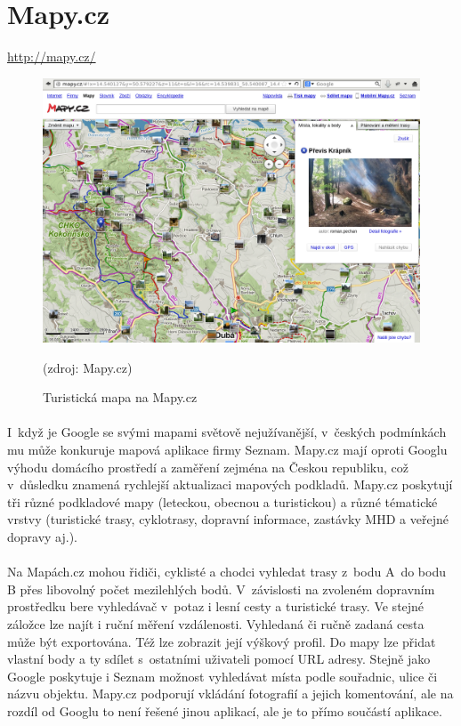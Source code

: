 \documentclass[11pt,a4paper,titlepage,oneside]{book}
\begin{document}
\newpage
	\section{Mapy.cz}
		\url{http://mapy.cz/}
			\begin{figure}[!h]
				\begin{center}
					\includegraphics[width=12cm]{obrazky/mapycz.png}
					\caption{Turistická mapa na Mapy.cz}
					(zdroj: Mapy.cz\cite{seznamMapa})
				\end{center}
			\end{figure}

		\paragraph{} I~když je Google se svými mapami světově nejužívanější, v~českých pod\-mínkách mu může konkuruje mapová aplikace firmy Seznam. Mapy.cz mají oproti Googlu výhodu domácího prostředí a zaměření zejména na Českou republiku, což v~důsledku znamená rychlejší aktualizaci mapových podkladů. Mapy.cz poskytují tři různé podkladové mapy (leteckou, obecnou a turistickou) a různé tématické vrstvy (turistické trasy, cyklotrasy, dopravní informace, zastávky MHD a veřejné dopravy aj.). 
		\paragraph{} Na Mapách.cz mohou řidiči, cyklisté a chodci vyhledat trasy z~bodu A~do bodu B přes libovolný počet mezilehlých bodů. V~závislosti na zvoleném dopravním prostředku bere vyhledávač v~potaz i lesní cesty a turistické trasy. Ve stejné záložce lze najít i ruční měření vzdálenosti. Vyhledaná či ručně zadaná cesta může být exportována. Též lze zobrazit její výškový profil. Do mapy lze přidat vlastní body a ty sdílet s~ostatními uživateli pomocí URL adresy. Stejně jako Google poskytuje i Seznam možnost vyhledávat místa podle souřadnic, ulice či názvu objektu. Mapy.cz podporují vkládání fotografií a jejich komentování, ale na rozdíl od Googlu to není řešené jinou aplikací, ale je to přímo součástí aplikace.
\end{document}
